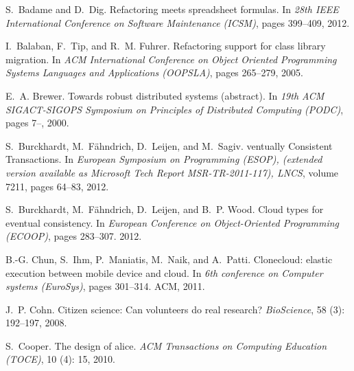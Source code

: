 \documentclass[article]{sigplanconf}
\begin{document}
\begin{thebibliography}{10}

S.~Badame and D.~Dig.
\newblock Refactoring meets spreadsheet formulas.
\newblock In \emph{28th IEEE International Conference on Software Maintenance
  (ICSM)}, pages 399--409, 2012.

I.~Balaban, F.~Tip, and R.~M. Fuhrer.
\newblock Refactoring support for class library migration.
\newblock In \emph{ACM International Conference on Object Oriented Programming
  Systems Languages and Applications (OOPSLA)}, pages 265--279, 2005.

E.~A. Brewer.
\newblock Towards robust distributed systems (abstract).
\newblock In \emph{19th ACM SIGACT-SIGOPS Symposium on Principles of
  Distributed Computing (PODC)}, pages 7--, 2000.

S.~Burckhardt, M.~F\"ahndrich, D.~Leijen, and M.~Sagiv.
ventually {C}onsistent {T}ransactions.
\newblock In \emph{European Symposium on Programming (ESOP), (extended version
  available as Microsoft Tech Report MSR-TR-2011-117), \textrm{LNCS}}, volume
  7211, pages 64--83, 2012{}.

S.~Burckhardt, M.~F{\"a}hndrich, D.~Leijen, and B.~P. Wood.
\newblock Cloud types for eventual consistency.
\newblock In \emph{European Conference on Object-Oriented Programming (ECOOP)},
  pages 283--307. 2012{}.

B.-G. Chun, S.~Ihm, P.~Maniatis, M.~Naik, and A.~Patti.
\newblock Clonecloud: elastic execution between mobile device and cloud.
\newblock In \emph{6th conference on Computer systems (EuroSys)}, pages
  301--314. ACM, 2011.

J.~P. Cohn.
\newblock Citizen science: Can volunteers do real research?
\newblock \emph{BioScience}, 58 (3): 192--197, 2008.

S.~Cooper.
\newblock The design of alice.
\newblock \emph{ACM Transactions on Computing Education (TOCE)}, 10
  (4): 15, 2010.


\end{thebibliography}
\end{document}
